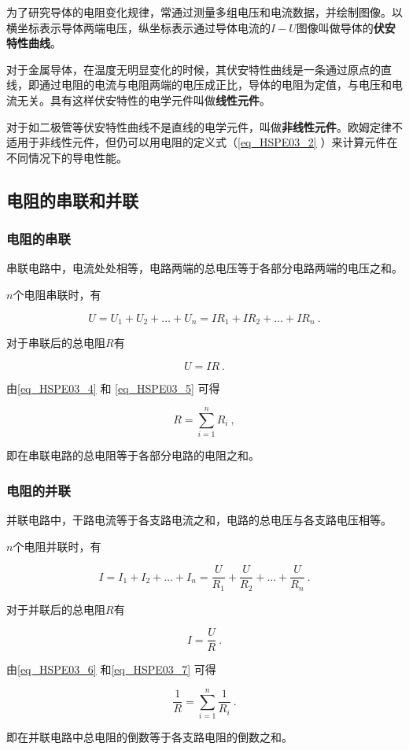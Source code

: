 为了研究导体的电阻变化规律，常通过测量多组电压和电流数据，并绘制图像。以横坐标表示导体两端电压，纵坐标表示通过导体电流的$I-U$图像叫做导体的\textbf{伏安特性曲线}。

对于金属导体，在温度无明显变化的时候，其伏安特性曲线是一条通过原点的直线，即通过电阻的电流与电阻两端的电压成正比，导体的电阻为定值，与电压和电流无关。具有这样伏安特性的电学元件叫做\textbf{线性元件}。

对于如二极管等伏安特性曲线不是直线的电学元件，叫做\textbf{非线性元件}。欧姆定律不适用于非线性元件，但仍可以用电阻的定义式（\autoref{eq_HSPE03_2} ）来计算元件在不同情况下的导电性能。

\subsection{电阻的串联和并联}

\subsubsection{电阻的串联}

串联电路中，电流处处相等，电路两端的总电压等于各部分电路两端的电压之和。

$n$个电阻串联时，有

\begin{equation}\label{eq_HSPE03_4}
U=U_1+U_2+\dots +U_n=IR_1+IR_2+\dots +IR_n~.
\end{equation}

对于串联后的总电阻$R$有

\begin{equation}\label{eq_HSPE03_5}
U=IR~.
\end{equation}

由\autoref{eq_HSPE03_4} 和 \autoref{eq_HSPE03_5} 可得

\begin{equation}
R=\sum_{i=1}^{n}R_i~,
\end{equation}

即在串联电路的总电阻等于各部分电路的电阻之和。

\subsubsection{电阻的并联}

并联电路中，干路电流等于各支路电流之和，电路的总电压与各支路电压相等。

$n$个电阻并联时，有

\begin{equation}\label{eq_HSPE03_6}
I=I_1+I_2+\dots +I_n=\frac{U}{R_1}+\frac{U}{R_2}+\dots +\frac{U}{R_n}~.
\end{equation}

对于并联后的总电阻$R$有

\begin{equation}\label{eq_HSPE03_7}
I=\frac{U}{R}~.
\end{equation}

由\autoref{eq_HSPE03_6} 和\autoref{eq_HSPE03_7} 可得

\begin{equation}
\frac{1}{R}=\sum_{i=1}^{n}\frac{1}{R_i}~.
\end{equation}

即在并联电路中总电阻的倒数等于各支路电阻的倒数之和。
